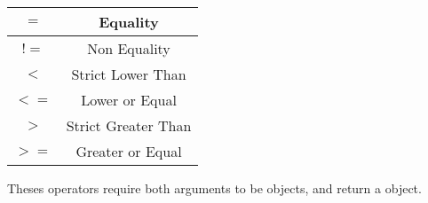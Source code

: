 \begin{tabular}{|c|c|}
\hline
$=$ & Equality \\
\hline
$!=$ & Non Equality \\
\hline
$<$  & Strict Lower Than \\
\hline
$<=$  & Lower or Equal \\
\hline
$>$  & Strict Greater Than \\
\hline
$>=$  & Greater or Equal \\
\hline
\end{tabular}\newline

Theses operators require both arguments to be  objects, and return a  object.



